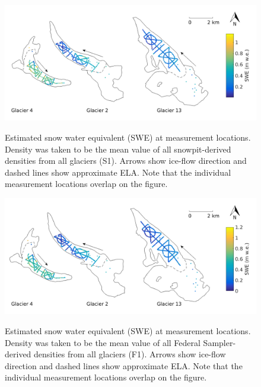 \documentclass{sfuthesis}
\begin{document}
\begin{figure}[H]
	\centering
	\includegraphics[width = \textwidth]{SWEmap_opt2.png}\\
	\caption{Estimated snow water equivalent (SWE) at measurement locations. Density was taken to be the mean value of all snowpit-derived densities from all glaciers (S1). Arrows show ice-flow direction and dashed lines show approximate ELA. Note that the individual measurement locations overlap on the figure.}
	\label{fig:SWEmap_S1}
\end{figure}

\begin{figure}[H]
	\centering
	\includegraphics[width = \textwidth]{SWEmap_opt3.png}\\
	\caption{Estimated snow water equivalent (SWE) at measurement locations. Density was taken to be the mean value of all Federal Sampler-derived densities from all glaciers (F1). Arrows show ice-flow direction and dashed lines show approximate ELA. Note that the individual measurement locations overlap on the figure.}
	\label{fig:SWEmap_F1}
\end{figure}
\end{document}
